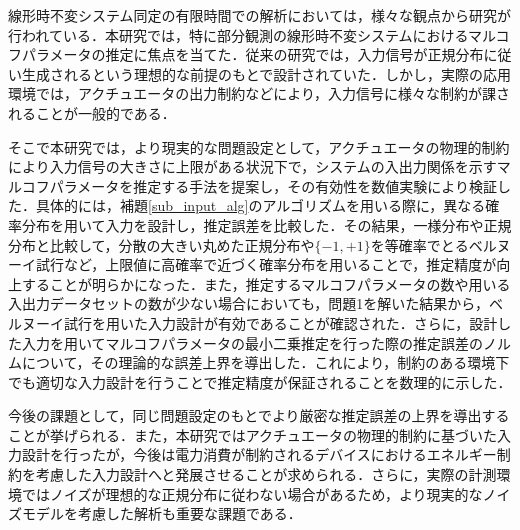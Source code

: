 
線形時不変システム同定の有限時間での解析においては，様々な観点から研究が行われている．本研究では，特に部分観測の線形時不変システムにおけるマルコフパラメータの推定に焦点を当てた．従来の研究では，入力信号が正規分布に従い生成されるという理想的な前提のもとで設計されていた．しかし，実際の応用環境では，アクチュエータの出力制約などにより，入力信号に様々な制約が課されることが一般的である．

そこで本研究では，より現実的な問題設定として，アクチュエータの物理的制約により入力信号の大きさに上限がある状況下で，システムの入出力関係を示すマルコフパラメータを推定する手法を提案し，その有効性を数値実験により検証した．具体的には，補題\ref{sub_input_alg}のアルゴリズムを用いる際に，異なる確率分布を用いて入力を設計し，推定誤差を比較した．その結果，一様分布や正規分布と比較して，分散の大きい丸めた正規分布や$\{−1, +1\}$を等確率でとるベルヌーイ試行など，上限値に高確率で近づく確率分布を用いることで，推定精度が向上することが明らかになった．また，推定するマルコフパラメータの数や用いる入出力データセットの数が少ない場合においても，問題1を解いた結果から，ベルヌーイ試行を用いた入力設計が有効であることが確認された．さらに，設計した入力を用いてマルコフパラメータの最小二乗推定を行った際の推定誤差のノルムについて，その理論的な誤差上界を導出した．これにより，制約のある環境下でも適切な入力設計を行うことで推定精度が保証されることを数理的に示した．

今後の課題として，同じ問題設定のもとでより厳密な推定誤差の上界を導出することが挙げられる．また，本研究ではアクチュエータの物理的制約に基づいた入力設計を行ったが，今後は電力消費が制約されるデバイスにおけるエネルギー制約を考慮した入力設計へと発展させることが求められる．さらに，実際の計測環境ではノイズが理想的な正規分布に従わない場合があるため，より現実的なノイズモデルを考慮した解析も重要な課題である．